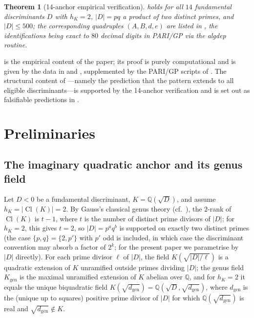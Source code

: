 \documentclass[11pt]{amsart}
\newtheorem{theorem}{Theorem}
\theoremstyle{definition}
\theoremstyle{remark}
\DeclareMathOperator{\Cl}{Cl}
\newcommand{\Q}{\mathbb{Q}}
\begin{document}
\begin{theorem}[14-anchor empirical verification]\label{thm:14-anchor}
 holds for all \(14\) fundamental discriminants
\(D\) with \(h_{K} = 2\), \(|D| = pq\) a product of two distinct
primes, and \(|D| \le 500\); the corresponding quadruples
\((A, B, d, e)\) are listed in , the identifications
being exact to \(80\) decimal digits in PARI/GP via the
\textsf{algdep} routine.
\end{theorem}

 is the empirical content of the paper; its
proof is purely computational and is given by the data in
 and , supplemented by the
PARI/GP scripts of . The structural content of
---namely the prediction that the pattern
extends to all eligible discriminants---is supported by the
14-anchor verification and is set out as falsifiable predictions in
.


\section{Preliminaries}\label{sec:prelim}

\subsection{The imaginary quadratic anchor and its genus field}

Let \(D < 0\) be a fundamental discriminant, \(K = \Q(\sqrt{D})\),
and assume \(h_{K} = |\Cl(K)| = 2\). By Gauss's classical genus
theory \cite[\S\S~225--237]{Gauss1801} (cf.~\cite[Thm.~3.15]{Cox1989}),
the \(2\)-rank of \(\Cl(K)\) is
\(t - 1\), where \(t\) is the number of distinct prime divisors of
\(|D|\); for \(h_{K} = 2\), this gives \(t = 2\), so \(|D| = p^{a} q^{b}\)
is supported on exactly two distinct primes (the case
$\{p,q\} = \{2, p'\}$ with $p'$ odd is included, in which case
the discriminant convention may absorb a factor of $2^k$; for the
present paper we
parametrise by \(|D|\) directly). For each prime divisor \(\ell\) of
\(|D|\), the field \(K(\sqrt{|D|/\ell})\) is a quadratic extension
of \(K\) unramified outside primes dividing \(|D|\); the genus
field \(K_{\mathrm{gen}}\) is the maximal unramified extension of
\(K\) abelian over \(\Q\), and for \(h_{K} = 2\) it equals the
unique biquadratic field
\(K(\sqrt{d_{\mathrm{gen}}}) = \Q(\sqrt{D}, \sqrt{d_{\mathrm{gen}}})\),
where \(d_{\mathrm{gen}}\) is the (unique up to squares) positive
prime divisor of \(|D|\) for which \(\Q(\sqrt{d_{\mathrm{gen}}})\) is
real and \(\sqrt{d_{\mathrm{gen}}} \notin K\).
\end{document}
